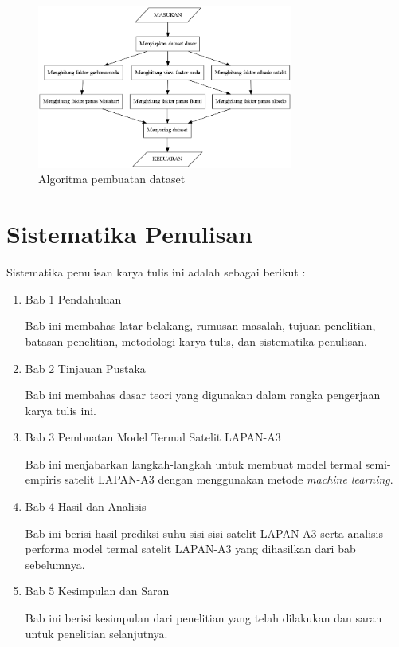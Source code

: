 \begin{figure}[H]
\setlength{}
\begin{center}
\includegraphics[width=0.75\textwidth]{fig/graph_algoritma.png}
\caption{Algoritma pembuatan dataset}
\label{fig:algoritma}
\end{center}
\end{figure}

\section{Sistematika Penulisan}

Sistematika penulisan karya tulis ini adalah sebagai berikut :

\begin{enumerate}
\item Bab 1 Pendahuluan

Bab ini membahas latar belakang, rumusan masalah, tujuan penelitian, batasan
penelitian, metodologi karya tulis, dan sistematika penulisan.

\item Bab 2 Tinjauan Pustaka

Bab ini membahas dasar teori yang digunakan dalam rangka pengerjaan karya tulis ini.

\item Bab 3 Pembuatan Model Termal Satelit LAPAN-A3

Bab ini menjabarkan langkah-langkah untuk membuat model termal semi-empiris
		satelit LAPAN-A3 dengan menggunakan metode \textit{machine learning}.

\item Bab 4 Hasil dan Analisis

Bab ini berisi hasil prediksi suhu sisi-sisi satelit LAPAN-A3 serta analisis performa model termal satelit LAPAN-A3 yang dihasilkan dari bab sebelumnya.

\item Bab 5 Kesimpulan dan Saran

Bab ini berisi kesimpulan dari penelitian yang telah dilakukan dan saran
untuk penelitian selanjutnya.
\end{enumerate}
